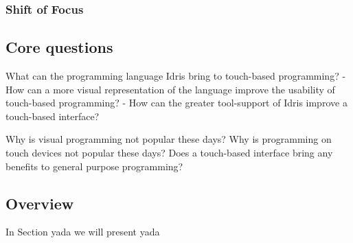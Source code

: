 \subsubsection{Shift of Focus}


\subsection{Core questions}
\label{subsec:CoreQuestions}


What can the programming language Idris bring to touch-based programming?
  - How can a more visual representation of the language improve the usability of touch-based programming?
  - How can the greater tool-support of Idris improve a touch-based interface?

Why is visual programming not popular these days?
Why is programming on touch devices not popular these days?
Does a touch-based interface bring any benefits to general purpose programming?



\subsection{Overview}
In Section yada we will present yada





